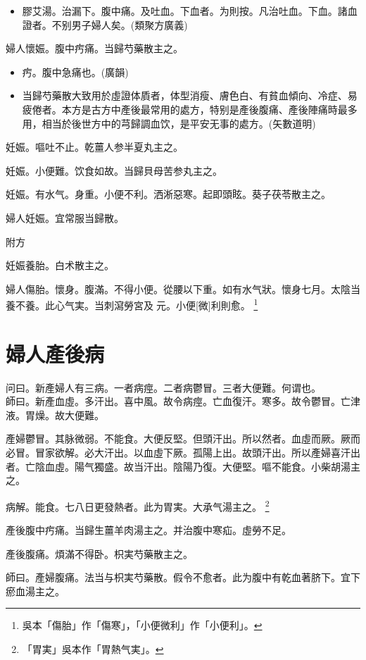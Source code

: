 \documentclass[11pt,oneside,b5paper]{ctexbook}
\begin{document}
\begin{flushleft}
\begin{itemize}
\item 膠艾湯。治漏下。腹中痛。及吐血。下血者。为則按。凡治吐血。下血。諸血證者。不别男子婦人矣。(類聚方廣義)
\end{itemize}

婦人懷娠。腹中㽲痛。当歸芍藥散主之。

\begin{itemize}
\item 㽲。腹中急痛也。(廣韻)
\item 当歸芍藥散大致用於虛證体貭者，体型消瘦、膚色白、有貧血傾向、冷症、易疲倦者。本方是古方中產後最常用的處方，特别是產後腹痛、產後陣痛時最多用，相当於後世方中的芎歸調血饮，是平安无事的處方。(矢數道明)
\end{itemize}

妊娠。嘔吐不止。乾薑人参半夏丸主之。

妊娠。小便難。饮食如故。当歸貝母苦参丸主之。

妊娠。有水气。身重。小便不利。洒淅惡寒。起即頭眩。葵子茯苓散主之。

婦人妊娠。宜常服当歸散。

附方

妊娠養胎。白术散主之。

婦人傷胎。懷身。腹滿。不得小便。從腰以下重。如有水气狀。懷身七月。太陰当養不養。此心气実。当刺瀉勞宮及{𬮦}元。小便[微]利則愈。
\footnote{吳本「傷胎」作「傷寒」，「小便微利」作「小便利」。}

\chapter{婦人產後病}

问曰。新產婦人有三病。一者病痙。二者病鬱冒。三者大便難。何谓也。\\
師曰。新產血虛。多汗出。喜中風。故令病痙。亡血復汗。寒多。故令鬱冒。亡津液。胃燥。故大便難。

產婦鬱冒。其脉微弱。不能食。大便反堅。但頭汗出。所以然者。血虛而厥。厥而必冒。冒家欲解。必大汗出。以血虛下厥。孤陽上出。故頭汗出。所以產婦喜汗出者。亡陰血虛。陽气獨盛。故当汗出。陰陽乃復。大便堅。嘔不能食。小柴胡湯主之。

病解。能食。七八日更發熱者。此为胃実。大承气湯主之。
\footnote{「胃実」吳本作「胃熱气実」。}

產後腹中㽲痛。当歸生薑羊肉湯主之。并治腹中寒疝。虛勞不足。

產後腹痛。煩滿不得卧。枳実芍藥散主之。

師曰。產婦腹痛。法当与枳実芍藥散。假令不愈者。此为腹中有乾血著脐下。宜下瘀血湯主之。


\end{flushleft}
\end{document}
